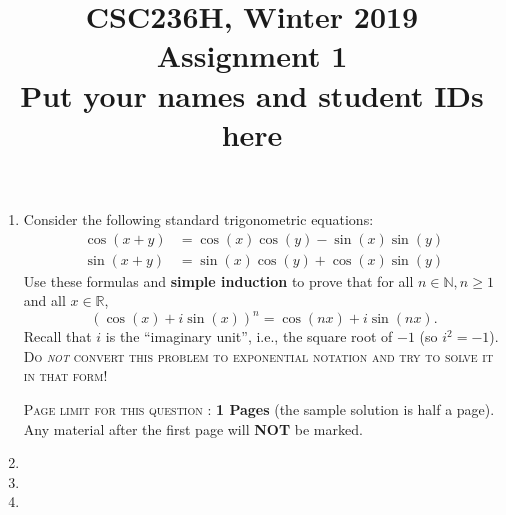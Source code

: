 \documentclass{article}
\title{CSC236H, Winter 2019\\
Assignment 1\\
Put your names and student IDs here}
\begin{document}
\maketitle

\begin{enumerate}

\item Consider the following standard trigonometric equations:
    \begin{align*}
        \cos(x + y) &= \cos(x) \cos(y) - \sin(x) \sin(y)\\
        \sin(x + y) &= \sin(x) \cos(y) + \cos(x) \sin(y)
    \end{align*}
    Use these formulas and \textbf{simple induction} to prove that for all $n\in \mathbb N, n\geq 1$ and all 
    $x \in\mathbb R$,
    \[
        (\cos(x) + i \sin(x))^n = \cos(nx) + i \sin(nx).
    \]
    Recall that $i$ is the ``imaginary unit'', i.e.,
    the square root of $-1$ (so $i^2 = -1$).\\

    \textsc{Do \emph{not} convert this problem to exponential notation
    and try to solve it in that form!}

\textsc{Page limit for this question} : \textbf{1 Pages} (the sample solution is half a page). Any material after the first page will \textbf{NOT} be marked.\\

\newpage

\item 
\newpage

\item 
\newpage

\item 
\end{enumerate}
\end{document}
